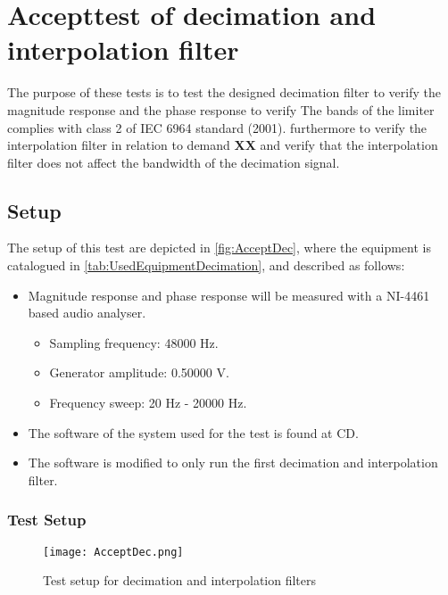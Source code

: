 \chapter{Accepttest of decimation and interpolation filter}\label{app:journal_decimationFilter}
The purpose of these tests is to test the designed decimation filter to verify the magnitude response and the phase response to verify The bands of the limiter complies with class 2 of IEC 6964 standard (2001). furthermore to verify the interpolation filter in relation to demand \textbf{XX} and verify that the interpolation filter does not affect the bandwidth of the decimation signal.





\section{Setup}
The setup of this test are depicted in \autoref{fig:AcceptDec}, where the equipment is catalogued in \autoref{tab:UsedEquipmentDecimation}, and described as follows:

\begin{itemize}\addtolength{\itemsep}{-.35\baselineskip} 
\item Magnitude response and phase response will be measured with a NI-4461 based audio analyser. 
\begin{itemize}\addtolength{\itemsep}{-.35\baselineskip} 
\item Sampling frequency: 48000 Hz.
\item Generator amplitude: 0.50000 V.
\item Frequency sweep: 20 Hz - 20000 Hz.
\end{itemize}
\item The software of the system used for the test is found at CD. 
\item The software is modified to only run the first decimation and interpolation filter.
\end{itemize}


\subsection*{Test Setup}
\begin{figure}[H]
\centering
\texttt{[image: AcceptDec.png]}
\caption{Test setup for decimation and interpolation filters}
\label{fig:AcceptDec}
\end{figure}

